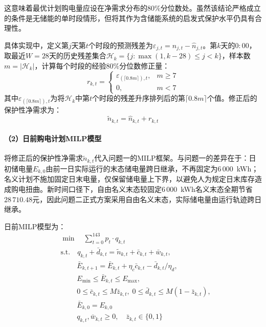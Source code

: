 \documentclass[12pt,a4paper]{ctexart}
\theoremstyle{definition}
\theoremstyle{plain}
\theoremstyle{remark}
\begin{document}
\noindent 这意味着最优计划购电量应设在净需求分布的$80\%$分位数处。虽然该结论严格成立的条件是无储能的单时段情形，但将其作为含储能系统的启发式保护水平仍具有合理性。

具体实现中，定义第$j$天第$t$个时段的预测残差为$\varepsilon_{j,t} = n_{j,t} - \widehat{n}_{j,t}$。第$k$天的$0{:}00$，取最近$W = 28$天的历史残差集合$\mathcal{H}_k = \{j: \max(1, k-28) \leq j < k\}$，样本数$m = |\mathcal{H}_k|$，计算每个时段的经验$80\%$分位数修正量：
\begin{equation}
  r_{k,t} = \begin{cases} \varepsilon_{(\lceil 0.8m \rceil), t}, & m \geq 7 \\ 0, & m < 7 \end{cases}
  \label{eq:q2_quantile_correction}
\end{equation}
\noindent 其中$\varepsilon_{(\lceil 0.8m \rceil), t}$为将$\mathcal{H}_k$中第$t$个时段的残差升序排列后的第$\lceil 0.8m \rceil$个值。修正后的保护性净需求为：
\begin{equation}
  \widetilde{n}_{k,t} = \widehat{n}_{k,t} + r_{k,t}
  \label{eq:q2_protected_demand}
\end{equation}

\paragraph{（2）日前购电计划MILP模型}

将修正后的保护性净需求$\widetilde{n}_{k,t}$代入问题一的MILP框架。与问题一的差异在于：日初储电量$E_{k,0}$由前一日实际运行的末态储电量跨日继承，不再固定为$6\,000$~kWh；名义计划不施加固定日末电量，仅保留储电量上下界，以避免人为规定日末库存造成购电扭曲。新时间口径下，自由名义末态较固定$6\,000$~kWh名义末态全期节省$28\,710.48$元，因此问题二正式方案采用自由名义末态，实际储电量由运行轨迹跨日继承。

日前MILP模型为：
\begin{equation}
\begin{aligned}
  & \boxed{\min \quad \sum_{t=0}^{143} p_t \cdot q_{k,t}} \\
  & \text{s.t.} \quad q_{k,t} + \bar{d}_{k,t} = \widetilde{n}_{k,t} + \bar{c}_{k,t} + \bar{w}_{k,t}, \\
  & \quad\quad\; \bar{E}_{k,t+1} = \bar{E}_{k,t} + \eta_c \bar{c}_{k,t} - \bar{d}_{k,t}/\eta_d, \\
  & \quad\quad\; E_{\min} \leq \bar{E}_{k,t} \leq E_{\max}, \\
  & \quad\quad\; 0 \leq \bar{c}_{k,t} \leq M \bar{z}_{k,t}, \; 0 \leq \bar{d}_{k,t} \leq M(1-\bar{z}_{k,t}), \\
  & \quad\quad\; \bar{E}_{k,0} = E_{k,0} \\
  & \quad\quad\; q_{k,t}, \bar{w}_{k,t} \geq 0, \quad \bar{z}_{k,t} \in \{0,1\}
\end{aligned}
\label{eq:q2_milp}
\end{equation}
\end{document}
